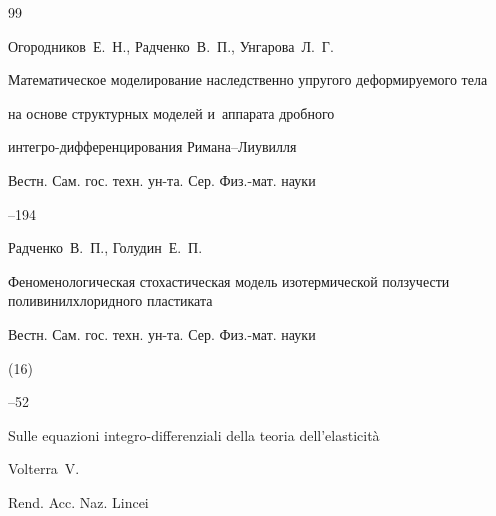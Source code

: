 \documentclass[11pt,a4paper,twoside]{article}
\begin{document}
\bigskip








\begin{thebibliography}{99}







\by Огородников~Е.~Н., Радченко~В.~П., Унгарова~Л.~Г.


\paper Математическое моделирование наследственно упругого деформируемого тела 


на основе структурных моделей и~аппарата дробного 


интегро-дифференцирования Римана--Лиувилля


\serial Вестн. Сам. гос. техн. ун-та. Сер. Физ.-мат. науки








--194













\by Радченко~В.~П., Голудин~Е.~П.


\paper Феноменологическая стохастическая модель изотермической ползучести поливинилхлоридного пластиката


\jour Вестн. Сам. гос. техн. ун-та. Сер. Физ.-мат. науки




(16)


--52











\paper Sulle equazioni integro-differenziali della teoria dell'elasticit\`a 


\by Volterra~V.


\jour Rend. Acc. Naz. Lincei





\end{thebibliography}
\end{document}
